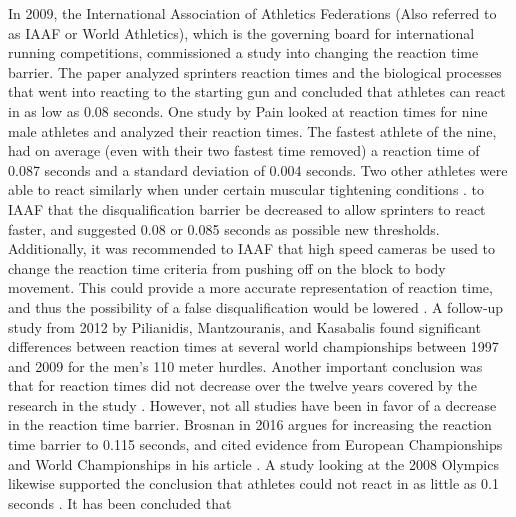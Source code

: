 \documentclass[12pt, letterpaper, titlepage]{article}
\begin{document}
In 2009, the International Association of Athletics Federations (Also referred to
as IAAF or World Athletics), which is the governing board for international running
competitions, commissioned a study into changing the reaction time barrier.
The paper analyzed sprinters reaction times and the biological processes 
that went into reacting to the starting gun and concluded 
that athletes can react in as low as 0.08 seconds.  One study by Pain looked at
reaction times for nine male athletes and analyzed their reaction times.  The
fastest athlete of the nine, had on average (even with their two fastest time 
removed) a reaction time of 0.087 seconds and a standard deviation of 0.004
seconds.  Two other athletes were able to react similarly when under certain
muscular tightening conditions \citep{pain2007sprint}.
to IAAF that the disqualification barrier be decreased to allow sprinters to
react faster, and suggested 0.08 or 0.085 seconds as possible new thresholds.
Additionally, it was recommended to IAAF that high speed cameras be used to
change the reaction time criteria from pushing off on the block to body movement.
This could provide a more accurate representation of reaction time, and thus the
possibility of a false disqualification would be lowered \citep{komi2009iaaf}.  
A follow-up study from 2012 by Pilianidis, Mantzouranis, and Kasabalis found
significant differences between reaction times at several world championships
between 1997 and 2009 for the men's 110 meter hurdles.  Another important
conclusion was that for reaction times did not decrease over the twelve years
covered by the research in the study \citep{pilianidis2012start}.  However, not
all studies have been in favor of a decrease in the reaction time barrier.
Brosnan in 2016 argues for increasing the reaction time barrier to 0.115 seconds,
and cited evidence from European Championships and World Championships in his
article \citep{brosnan2017effects}.  A study looking at the 2008 Olympics
likewise supported the conclusion that athletes could not react in as little as
0.1 seconds \citep{lipps2011implications}.
It has been concluded that


\end{document}
